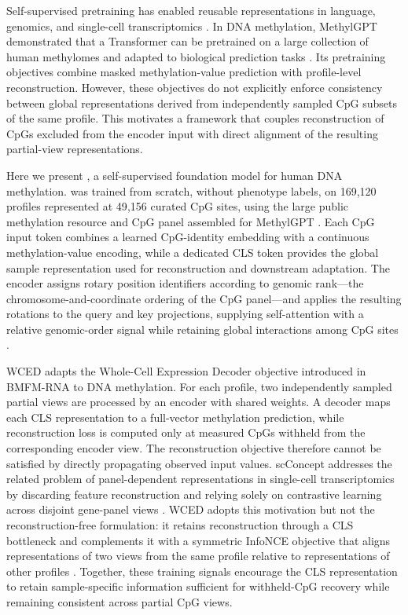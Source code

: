 Self-supervised pretraining has enabled reusable representations in language, genomics, and
single-cell transcriptomics \citep{Devlin2019,Ji2021,Yang2022,Cui2024}. In DNA methylation,
MethylGPT demonstrated that a Transformer can be pretrained on a large collection of human
methylomes and adapted to biological prediction tasks \citep{Ying2024}. Its pretraining
objectives combine masked methylation-value prediction with profile-level reconstruction.
However, these objectives do not explicitly enforce consistency between global representations
derived from independently sampled CpG subsets of the same profile. This motivates a framework
that couples reconstruction of CpGs excluded from the encoder input with direct alignment of the
resulting partial-view representations.

Here we present \method{}, a self-supervised foundation model for human DNA methylation.
\method{} was trained from scratch, without phenotype labels, on 169{,}120 profiles represented
at 49{,}156 curated CpG sites, using the large public methylation resource and CpG panel assembled
for MethylGPT \citep{Ying2024}. Each CpG input token combines a learned CpG-identity embedding
with a continuous methylation-value encoding, while a dedicated CLS token provides the global
sample representation used for reconstruction and downstream adaptation. The encoder assigns
rotary position identifiers according to genomic rank---the chromosome-and-coordinate ordering
of the CpG panel---and applies the
resulting rotations to the query and key projections, supplying self-attention with a relative
genomic-order signal while retaining global interactions among CpG sites \citep{Su2024}.

WCED adapts the Whole-Cell Expression Decoder objective introduced in BMFM-RNA
\citep{Dandala2025} to DNA methylation. For each profile, two independently sampled partial
views are processed by an encoder with shared weights. A decoder maps each CLS representation
to a full-vector methylation prediction, while reconstruction loss is computed only at measured
CpGs withheld from the corresponding encoder view. The reconstruction objective therefore cannot
be satisfied by directly propagating observed input values. scConcept addresses the related
problem of panel-dependent representations in single-cell transcriptomics by discarding feature
reconstruction and relying solely on contrastive learning across disjoint gene-panel views
\citep{Bahrami2025}. WCED adopts this motivation but not the reconstruction-free formulation:
it retains reconstruction through a CLS bottleneck and complements it with a symmetric InfoNCE
objective that aligns representations of two views from the same profile relative to
representations of other profiles \citep{Oord2018}.
Together, these training signals encourage the CLS representation to retain sample-specific
information sufficient for withheld-CpG recovery while remaining consistent across partial CpG
views.

